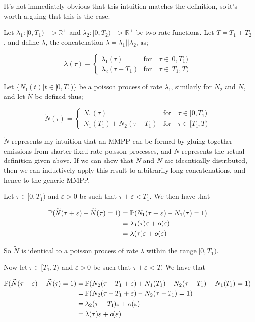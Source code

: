 It's not immediately obvious that this intuition matches the definition, so it's worth arguing that this is the case.

Let $\lambda_1: [0,T_1) -> \mathbb{R}^{+}$ and $\lambda_2:[0,T_2) -> \mathbb{R}^{+}$ be two rate functions. Let $T = T_1 + T_2$, and define $\lambda$, the concatenation $\lambda = \lambda_1 || \lambda_2$, as;

$$
\lambda(\tau) = 
\begin{cases}
	\lambda_1(\tau) & \mbox{for} \quad \tau \in [0,T_1)\\
	\lambda_2(\tau-T_1) & \mbox{for} \quad \tau \in [T_1,T)
\end{cases}
$$

Let $\{N_1(t) | t \in [0,T_1)\}$ be a poisson process of rate $\lambda_1$, similarly for $N_2$ and $N$, and let $\widetilde{N}$ be defined thus;

$$
\widetilde{N}(\tau) = 
\begin{cases}
	N_1(\tau) & \mbox{for} \quad \tau \in [0,T_1)\\
	N_1(T_1) + N_2(\tau-T_1) & \mbox{for} \quad \tau \in [T_1,T)
\end{cases}
$$

$\widetilde{N}$ represents my intuition that an MMPP can be formed by gluing together emissions from shorter fixed rate poisson processes, and $N$ represents the actual definition given above. If we can show that $\widetilde{N}$ and $N$ are ideentically distributed, then we can inductively apply this result to arbitrarily long concatenations, and hence to the generic MMPP.

Let $\tau \in [0,T_1)$ and $\varepsilon>0$ be such that $\tau + \varepsilon < T_1$. We then have that

\begin{align*}
\mathbb{P} (\widetilde{N}(\tau+\varepsilon) - \widetilde{N}(\tau) = 1)
	&= \mathbb{P} (N_1(\tau+\varepsilon) - N_1(\tau) = 1) \\
	&= \lambda_1(\tau)\varepsilon + o(\varepsilon) \\
	&= \lambda(\tau)\varepsilon + o(\varepsilon)
\end{align*} 

So $\widetilde{N}$ is identical to a poisson process of rate $\lambda$ within the range $[0,T_1)$.

Now let $\tau \in [T_1,T)$ and $\varepsilon>0$ be such that $\tau + \varepsilon < T$. We have that

\begin{align*}
\mathbb{P} (\widetilde{N}(\tau+\varepsilon) - \widetilde{N}(\tau) = 1)
	&= \mathbb{P} (N_2(\tau-T_1+\varepsilon) + N_1(T_1) - N_2(\tau-T_1) - N_1(T_1)= 1)\\
	&= \mathbb{P} (N_2(\tau-T_1+\varepsilon) - N_2(\tau-T_1) = 1)\\
	&= \lambda_2(\tau-T_1)\varepsilon + o(\varepsilon) \\
	&= \lambda(\tau)\varepsilon + o(\varepsilon)
\end{align*}

